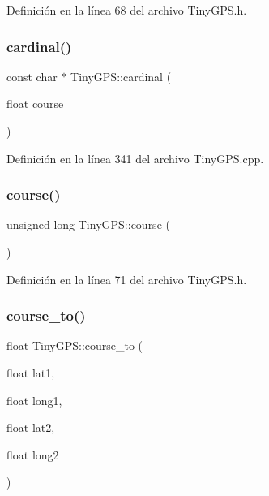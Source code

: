 Definición en la línea 68 del archivo Tiny\+G\+P\+S.\+h.

\mbox{\label{class_tiny_g_p_s_a8aeef91f9559578d0a0fbc7482adcb17}} 
\subsubsection{\texorpdfstring{cardinal()}{cardinal()}}
{\footnotesize\ttfamily const char $\ast$ Tiny\+G\+P\+S\+::cardinal (\begin{DoxyParamCaption}\item[{float}]{course }\end{DoxyParamCaption})\hspace{0.3cm}{\ttfamily [static]}}



Definición en la línea 341 del archivo Tiny\+G\+P\+S.\+cpp.

\mbox{\label{class_tiny_g_p_s_adbc4a27bc7a804b3f967b15b6091d715}} 
\subsubsection{\texorpdfstring{course()}{course()}}
{\footnotesize\ttfamily unsigned long Tiny\+G\+P\+S\+::course (\begin{DoxyParamCaption}{ }\end{DoxyParamCaption})\hspace{0.3cm}{\ttfamily [inline]}}



Definición en la línea 71 del archivo Tiny\+G\+P\+S.\+h.

\mbox{\label{class_tiny_g_p_s_a0655fb2ba390b299252c09779f4472fb}} 
\subsubsection{\texorpdfstring{course\+\_\+to()}{course\_to()}}
{\footnotesize\ttfamily float Tiny\+G\+P\+S\+::course\+\_\+to (\begin{DoxyParamCaption}\item[{float}]{lat1,  }\item[{float}]{long1,  }\item[{float}]{lat2,  }\item[{float}]{long2 }\end{DoxyParamCaption})\hspace{0.3cm}{\ttfamily [static]}}



